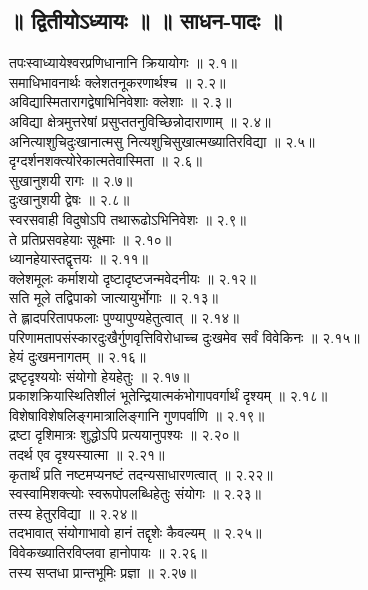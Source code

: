 \begin{multicols}{2}
\section*{॥ द्वितीयोऽध्यायः ॥  ॥ साधन-पादः ॥}
\begin{flushleft}
\devanagarifont
तपःस्वाध्यायेश्वरप्रणिधानानि क्रियायोगः ॥ २.१॥\\
समाधिभावनार्थः क्लेशतनूकरणार्थश्च ॥ २.२॥\\
अविद्यास्मितारागद्वेषाभिनिवेशाः क्लेशाः ॥ २.३॥\\
अविद्या क्षेत्रमुत्तरेषां प्रसुप्ततनुविच्छिन्नोदाराणाम् ॥ २.४॥\\
अनित्याशुचिदुःखानात्मसु नित्यशुचिसुखात्मख्यातिरविद्या ॥ २.५॥\\
दृग्दर्शनशक्त्योरेकात्मतेवास्मिता ॥ २.६॥\\
सुखानुशयी रागः ॥ २.७॥\\
दुःखानुशयी द्वेषः ॥ २.८॥\\
स्वरसवाही विदुषोऽपि तथारूढोऽभिनिवेशः ॥ २.९॥\\
ते प्रतिप्रसवहेयाः सूक्ष्माः ॥ २.१०॥\\
ध्यानहेयास्तद्वृत्तयः ॥ २.११॥\\
क्लेशमूलः कर्माशयो दृष्टादृष्टजन्मवेदनीयः ॥ २.१२॥\\
सति मूले तद्विपाको जात्यायुर्भोगाः ॥ २.१३॥\\
ते ह्लादपरितापफलाः पुण्यापुण्यहेतुत्वात् ॥ २.१४॥\\
परिणामतापसंस्कारदुःखैर्गुणवृत्तिविरोधाच्च दुःखमेव सर्वं विवेकिनः ॥ २.१५॥\\
हेयं दुःखमनागतम् ॥ २.१६॥\\
द्रष्टृदृश्ययोः संयोगो हेयहेतुः ॥ २.१७॥\\
प्रकाशक्रियास्थितिशीलं भूतेन्द्रियात्मकंभोगापवर्गार्थं दृश्यम् ॥ २.१८॥\\
विशेषाविशेषलिङ्गमात्रालिङ्गानि गुणपर्वाणि ॥ २.१९॥\\
द्रष्टा दृशिमात्रः शुद्धोऽपि प्रत्ययानुपश्यः ॥ २.२०॥\\
तदर्थ एव दृश्यस्यात्मा ॥ २.२१॥\\
कृतार्थं प्रति नष्टमप्यनष्टं तदन्यसाधारणत्वात् ॥ २.२२॥\\
स्वस्वामिशक्त्योः स्वरूपोपलब्धिहेतुः संयोगः ॥ २.२३॥\\
तस्य हेतुरविद्या ॥ २.२४॥\\
तदभावात् संयोगाभावो हानं तद्दृशेः कैवल्यम् ॥ २.२५॥\\
विवेकख्यातिरविप्लवा हानोपायः ॥ २.२६॥\\
तस्य सप्तधा प्रान्तभूमिः प्रज्ञा ॥ २.२७॥\\

\end{flushleft}
\end{multicols}
